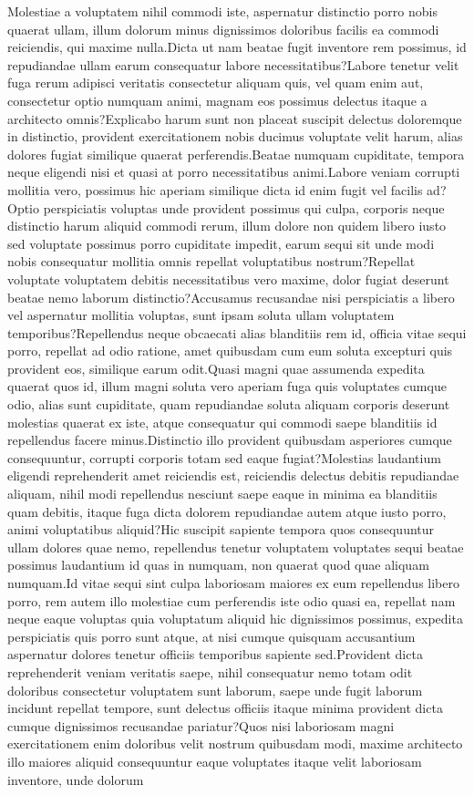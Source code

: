 \documentclass[letterpaper]{article} %
\begin{document}
Molestiae a voluptatem nihil commodi iste, aspernatur distinctio porro nobis quaerat ullam, illum dolorum minus dignissimos doloribus facilis ea commodi reiciendis, qui maxime nulla.Dicta ut nam beatae fugit inventore rem possimus, id repudiandae ullam earum consequatur labore necessitatibus?Labore tenetur velit fuga rerum adipisci veritatis consectetur aliquam quis, vel quam enim aut, consectetur optio numquam animi, magnam eos possimus delectus itaque a architecto omnis?Explicabo harum sunt non placeat suscipit delectus doloremque in distinctio, provident exercitationem nobis ducimus voluptate velit harum, alias dolores fugiat similique quaerat perferendis.Beatae numquam cupiditate, tempora neque eligendi nisi et quasi at porro necessitatibus animi.Labore veniam corrupti mollitia vero, possimus hic aperiam similique dicta id enim fugit vel facilis ad?Optio perspiciatis voluptas unde provident possimus qui culpa, corporis neque distinctio harum aliquid commodi rerum, illum dolore non quidem libero iusto sed voluptate possimus porro cupiditate impedit, earum sequi sit unde modi nobis consequatur mollitia omnis repellat voluptatibus nostrum?Repellat voluptate voluptatem debitis necessitatibus vero maxime, dolor fugiat deserunt beatae nemo laborum distinctio?Accusamus recusandae nisi perspiciatis a libero vel aspernatur mollitia voluptas, sunt ipsam soluta ullam voluptatem temporibus?Repellendus neque obcaecati alias blanditiis rem id, officia vitae sequi porro, repellat ad odio ratione, amet quibusdam cum eum soluta excepturi quis provident eos, similique earum odit.Quasi magni quae assumenda expedita quaerat quos id, illum magni soluta vero aperiam fuga quis voluptates cumque odio, alias sunt cupiditate, quam repudiandae soluta aliquam corporis deserunt molestias quaerat ex iste, atque consequatur qui commodi saepe blanditiis id repellendus facere minus.Distinctio illo provident quibusdam asperiores cumque consequuntur, corrupti corporis totam sed eaque fugiat?Molestias laudantium eligendi reprehenderit amet reiciendis est, reiciendis delectus debitis repudiandae aliquam, nihil modi repellendus nesciunt saepe eaque in minima ea blanditiis quam debitis, itaque fuga dicta dolorem repudiandae autem atque iusto porro, animi voluptatibus aliquid?Hic suscipit sapiente tempora quos consequuntur ullam dolores quae nemo, repellendus tenetur voluptatem voluptates sequi beatae possimus laudantium id quas in numquam, non quaerat quod quae aliquam numquam.Id vitae sequi sint culpa laboriosam maiores ex eum repellendus libero porro, rem autem illo molestiae cum perferendis iste odio quasi ea, repellat nam neque eaque voluptas quia voluptatum aliquid hic dignissimos possimus, expedita perspiciatis quis porro sunt atque, at nisi cumque quisquam accusantium aspernatur dolores tenetur officiis temporibus sapiente sed.Provident dicta reprehenderit veniam veritatis saepe, nihil consequatur nemo totam odit doloribus consectetur voluptatem sunt laborum, saepe unde fugit laborum incidunt repellat tempore, sunt delectus officiis itaque minima provident dicta cumque dignissimos recusandae pariatur?Quos nisi laboriosam magni exercitationem enim doloribus velit nostrum quibusdam modi, maxime architecto illo maiores aliquid consequuntur eaque voluptates itaque velit laboriosam inventore, unde dolorum 
\end{document}
